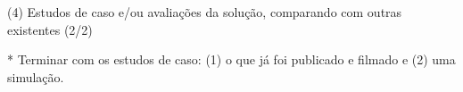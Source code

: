 (4) Estudos de caso e/ou avaliações da solução, comparando com outras existentes (2/2)


* Terminar com os estudos de caso: (1) o que já foi publicado e filmado e (2) uma simulação.